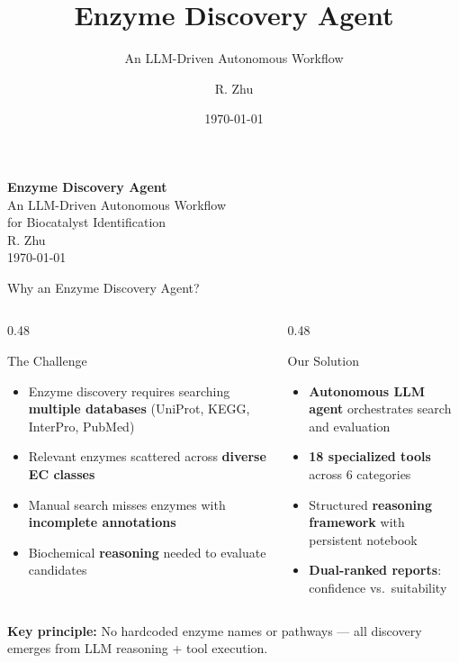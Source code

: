 \documentclass[aspectratio=169, 11pt]{beamer}
\title{Enzyme Discovery Agent}
\subtitle{An LLM-Driven Autonomous Workflow}
\author{R. Zhu}
\date{\today}
\begin{document}
{
\begin{frame}[plain]
\vfill
\begin{center}
{\Huge\bfseries\color{white} Enzyme Discovery Agent}\\[12pt]
{\Large\color{lightblue} An LLM-Driven Autonomous Workflow\\for Biocatalyst Identification}\\[24pt]
{\large\color{white} R. Zhu}\\[6pt]
{\normalsize\color{lightblue!70} \today}
\end{center}
\vfill
\end{frame}
}

\begin{frame}{Why an Enzyme Discovery Agent?}
\begin{columns}[T]
\begin{column}{0.48\textwidth}
\begin{alertblock}{The Challenge}
\begin{itemize}
\item Enzyme discovery requires searching \textbf{multiple databases} (UniProt, KEGG, InterPro, PubMed)
\item Relevant enzymes scattered across \textbf{diverse EC classes}
\item Manual search misses enzymes with \textbf{incomplete annotations}
\item Biochemical \textbf{reasoning} needed to evaluate candidates
\end{itemize}
\end{alertblock}
\end{column}
\begin{column}{0.48\textwidth}
\begin{exampleblock}{Our Solution}
\begin{itemize}
\item \textbf{Autonomous LLM agent} orchestrates search and evaluation
\item \textbf{18 specialized tools} across 6 categories
\item Structured \textbf{reasoning framework} with persistent notebook
\item \textbf{Dual-ranked reports}: confidence vs.\ suitability
\end{itemize}
\end{exampleblock}
\end{column}
\end{columns}

\vspace{4pt}
\begin{center}
\colorbox{lightblue!50}{\parbox{0.88\textwidth}{\centering
\small\textbf{Key principle:} No hardcoded enzyme names or pathways --- all discovery emerges from LLM reasoning + tool execution.
}}
\end{center}
\end{frame}
\end{document}
